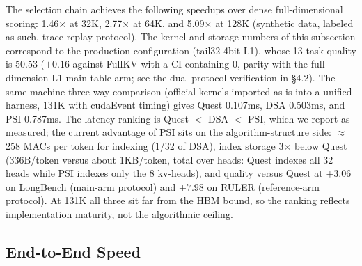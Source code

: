 \documentclass[11pt]{article}
\begin{document}
The selection chain achieves the following speedups over dense full-dimensional scoring: 1.46$\times$ at 32K, 2.77$\times$ at 64K, and 5.09$\times$ at 128K (synthetic data, labeled as such, trace-replay protocol). The kernel and storage numbers of this subsection correspond to the production configuration (tail32-4bit L1), whose 13-task quality is 50.53 ($+0.16$ against FullKV with a CI containing 0, parity with the full-dimension L1 main-table arm; see the dual-protocol verification in \S4.2). The same-machine three-way comparison (official kernels imported as-is into a unified harness, 131K with cudaEvent timing) gives Quest 0.107ms, DSA 0.503ms, and PSI 0.787ms. The latency ranking is Quest $<$ DSA $<$ PSI, which we report as measured; the current advantage of PSI sits on the algorithm-structure side: $\approx$258 MACs per token for indexing (1/32 of DSA), index storage 3$\times$ below Quest (336B/token versus about 1KB/token, total over heads: Quest indexes all 32 heads while PSI indexes only the 8 kv-heads), and quality versus Quest at $+3.06$ on LongBench (main-arm protocol) and $+7.98$ on RULER (reference-arm protocol). At 131K all three sit far from the HBM bound, so the ranking reflects implementation maturity, not the algorithmic ceiling.

\subsection{End-to-End Speed}
\end{document}
